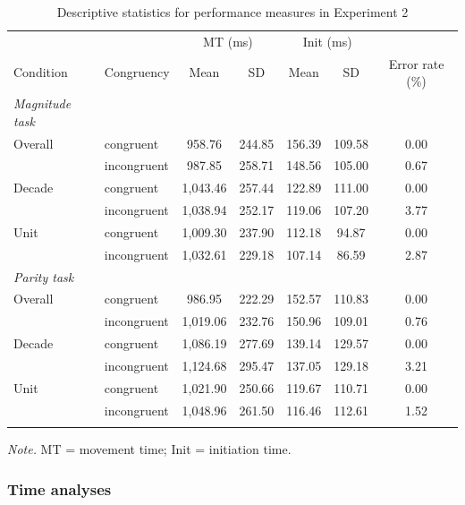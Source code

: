 \documentclass[english,man]{apa6}
\theoremstyle{definition}
\theoremstyle{definition}
\theoremstyle{definition}
\theoremstyle{remark}
\begin{document}
\begin{table}[tbp]
\begin{center}
\begin{threeparttable}
\caption{\label{tab:exp2table}Descriptive statistics for performance measures in Experiment 2}
\begin{tabular}{llccccc}
\toprule
 &  & \multicolumn{2}{c}{MT (ms)} & \multicolumn{2}{c}{Init (ms)}  &\\
\cmidrule(r){3-4} \cmidrule(r){5-6}
Condition & \multicolumn{1}{c}{Congruency} & \multicolumn{1}{c}{Mean} & \multicolumn{1}{c}{SD} & \multicolumn{1}{c}{Mean} & \multicolumn{1}{c}{SD} & \multicolumn{1}{c}{Error rate (\%)}\\
\midrule
{\it Magnitude task} &  &  &  &  &  & \\
Overall & congruent & 958.76 & 244.85 & 156.39 & 109.58 & 0.00\\
 & incongruent & 987.85 & 258.71 & 148.56 & 105.00 & 0.67\\
Decade & congruent & 1,043.46 & 257.44 & 122.89 & 111.00 & 0.00\\
 & incongruent & 1,038.94 & 252.17 & 119.06 & 107.20 & 3.77\\
Unit & congruent & 1,009.30 & 237.90 & 112.18 & 94.87 & 0.00\\
 & incongruent & 1,032.61 & 229.18 & 107.14 & 86.59 & 2.87\\
{\it Parity task} &  &  &  &  &  & \\
Overall & congruent & 986.95 & 222.29 & 152.57 & 110.83 & 0.00\\
 & incongruent & 1,019.06 & 232.76 & 150.96 & 109.01 & 0.76\\
Decade & congruent & 1,086.19 & 277.69 & 139.14 & 129.57 & 0.00\\
 & incongruent & 1,124.68 & 295.47 & 137.05 & 129.18 & 3.21\\
Unit & congruent & 1,021.90 & 250.66 & 119.67 & 110.71 & 0.00\\
 & incongruent & 1,048.96 & 261.50 & 116.46 & 112.61 & 1.52\\
\bottomrule
\addlinespace
\end{tabular}
\begin{tablenotes}[para]
\textit{Note.} MT = movement time; Init = initiation time.
\end{tablenotes}
\end{threeparttable}
\end{center}
\end{table}

\subsubsection{Time analyses}\label{time-analyses}
\end{document}
